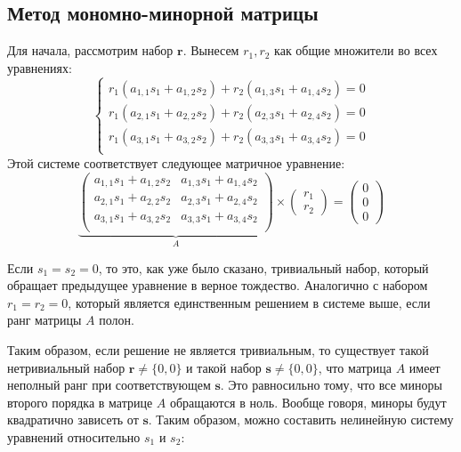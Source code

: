 \subsection{Метод мономно-минорной матрицы}

Для начала, рассмотрим набор $\mathbf{r}$. Вынесем $r_1, r_2$ как общие множители во всех уравнениях:
\begin{equation}\label{eq:trivial_r}
	\begin{cases}
		r_1(a_{1,1} s_1 + a_{1,2} s_2) + r_2(a_{1,3} s_1 + a_{1,4} s_2) = 0 \\
		r_1(a_{2,1} s_1 + a_{2,2} s_2) + r_2(a_{2,3} s_1 + a_{2,4} s_2) = 0 \\
		r_1(a_{3,1} s_1 + a_{3,2} s_2) + r_2(a_{3,3} s_1 + a_{3,4} s_2) = 0 \\
	\end{cases}
\end{equation}
Этой системе соответствует следующее матричное уравнение:
$$
	\underbrace{
	\begin{pmatrix}
		a_{1,1} s_1 + a_{1,2} s_2 & a_{1,3} s_1 + a_{1,4} s_2 \\
		a_{2,1} s_1 + a_{2,2} s_2 & a_{2,3} s_1 + a_{2,4} s_2 \\
		a_{3,1} s_1 + a_{3,2} s_2 & a_{3,3} s_1 + a_{3,4} s_2 \\
	\end{pmatrix}}_{A}
	\times
	\begin{pmatrix}
		r_1 \\
		r_2
	\end{pmatrix}=
	\begin{pmatrix}
		0 \\
		0 \\
		0
	\end{pmatrix}
$$

Если $s_1=s_2=0$, то это, как уже было сказано, тривиальный набор, который обращает предыдущее уравнение 
в верное тождество. Аналогично с набором $r_1 = r_2 = 0$, который является единственным решением в 
системе выше, если ранг матрицы $A$ полон. 

Таким образом, если решение не является тривиальным, то существует такой нетривиальный набор $\mathbf{r}
\ne \{0, 0\}$ и такой набор $\mathbf{s} \ne \{0, 0\}$, что матрица $A$ имеет неполный ранг при 
соответствующем $\mathbf{s}$. Это равносильно тому, что все миноры второго порядка в матрице $A$ 
обращаются в ноль. Вообще говоря, миноры будут квадратично зависеть от $\mathbf{s}$. Таким образом, можно 
составить нелинейную систему уравнений относительно $s_1$ и $s_2$: 

